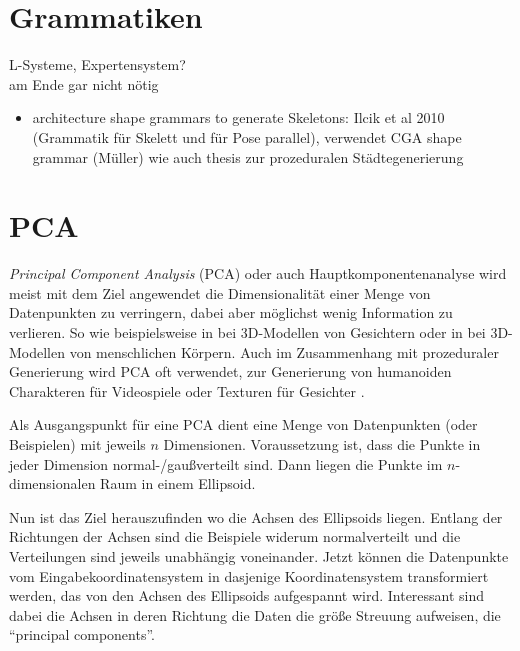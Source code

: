 \section{Grammatiken}

L-Systeme, Expertensystem?\\
am Ende gar nicht nötig

\begin{itemize}
 \item architecture shape grammars to generate Skeletons: Ilcik et al 2010 (Grammatik für Skelett und für Pose parallel), verwendet CGA shape grammar (Müller) wie auch thesis zur prozeduralen Städtegenerierung
\end{itemize}



\section{PCA} %
\label{PCA}

 
 \emph{Principal Component Analysis} (PCA) oder auch Hauptkomponentenanalyse \cite{PCA} wird meist mit dem Ziel angewendet die Dimensionalität einer Menge von Datenpunkten zu verringern, dabei aber möglichst wenig Information zu verlieren.
 So wie beispielsweise in \cite{PCA_faces} bei 3D-Modellen von Gesichtern oder in \cite{PCA_bodies} bei 3D-Modellen von menschlichen Körpern. Auch im Zusammenhang mit prozeduraler Generierung wird PCA oft verwendet, \zb zur Generierung von humanoiden Charakteren für Videospiele \cite{ProceduralCharacterGeneration} oder Texturen für Gesichter \cite{GeneratingFacialTextures}.
 
 Als Ausgangspunkt für eine PCA dient eine Menge von Datenpunkten (oder Beispielen) mit jeweils $n$ Dimensionen. Voraussetzung ist, dass die Punkte in jeder Dimension normal-/gaußverteilt sind. Dann liegen die Punkte im $n$-dimensionalen Raum in einem Ellipsoid.
 
 Nun ist das Ziel herauszufinden wo die Achsen des Ellipsoids liegen. Entlang der Richtungen der Achsen sind die Beispiele widerum normalverteilt und die Verteilungen sind jeweils unabhängig voneinander.
 Jetzt können die Datenpunkte vom Eingabekoordinatensystem in dasjenige Koordinatensystem transformiert werden, das von den Achsen des Ellipsoids aufgespannt wird. Interessant sind dabei die Achsen in deren Richtung die Daten die größe Streuung aufweisen, die "`principal components"'. 
 
